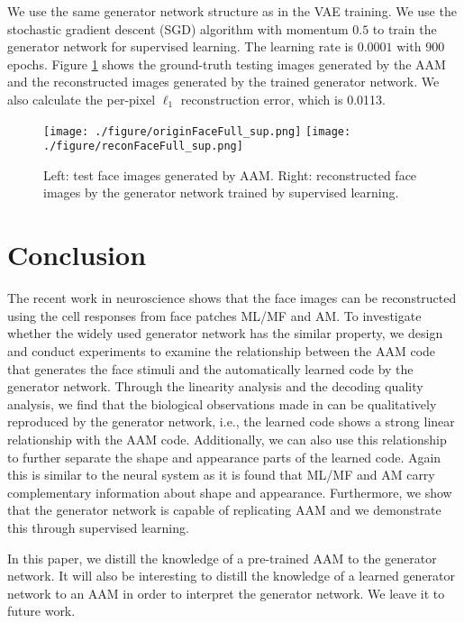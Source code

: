\documentclass{article}
\begin{document}
We use the same generator network structure as in the VAE training. We use the stochastic gradient descent (SGD) algorithm with momentum $0.5$ to train the generator network for supervised learning. The learning rate is $0.0001$ with $900$ epochs. Figure \ref{fig:AAM_rep} shows the ground-truth testing images generated by the AAM and the reconstructed images generated by the trained generator network. We also calculate the per-pixel $\ell_1$ reconstruction error, which is 0.0113.

\begin{figure}[h]
	\begin{center}
		\texttt{[image: ./figure/originFaceFull\_sup.png]}\hspace{0.5mm}
		\texttt{[image: ./figure/reconFaceFull\_sup.png]}
		\caption{Left: test face images generated by AAM. Right: reconstructed face images by the generator network trained by supervised learning.}
		\label{fig:AAM_rep}
	\end{center}
\end{figure}

\section{Conclusion}%
The recent work in neuroscience \cite{chang2017code} shows that the face images can be  reconstructed using the cell responses from face patches ML/MF and AM. To investigate whether the widely used generator network has the similar property, we design and conduct experiments to examine the relationship between  the AAM code that generates the face stimuli and the automatically learned code by the generator network. Through the linearity analysis and the decoding quality analysis, we  find that the biological observations made in \cite{chang2017code} can be qualitatively reproduced by the generator network, i.e., the learned code shows a strong linear relationship with the AAM code. Additionally, we can also use this relationship to further separate the shape and appearance parts of the learned code. Again this is similar to the neural system as it is found that ML/MF and AM carry complementary information about shape and appearance.
Furthermore, we show that the generator network is capable of replicating AAM and we demonstrate this through supervised learning.

In this paper, we distill the knowledge of a pre-trained AAM to the generator network. It will also be interesting to distill the knowledge of a learned generator network to an AAM in order to interpret the generator network. We leave it to future work.
\end{document}

